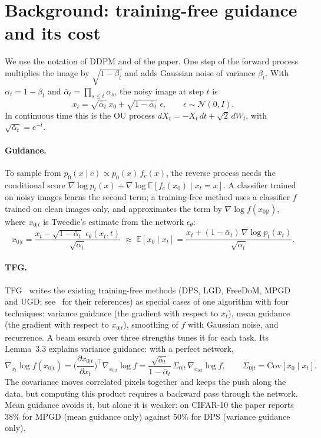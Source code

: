 \documentclass[11pt]{article}
\newcommand{\E}{\mathbb{E}}
\newcommand{\N}{\mathcal{N}}
\begin{document}
\section{Background: training-free guidance and its cost}
We use the notation of DDPM and of the paper. One step of the forward process multiplies the image by
$\sqrt{1-\beta_t}$ and adds Gaussian noise of variance $\beta_t$. With $\alpha_t = 1-\beta_t$ and
$\bar\alpha_t = \prod_{s\le t}\alpha_s$, the noisy image at step $t$ is
\begin{equation}\label{eq:forward}
  x_t = \sqrt{\bar\alpha_t}\,x_0 + \sqrt{1-\bar\alpha_t}\;\epsilon, \qquad \epsilon\sim\N(0, I).
\end{equation}
In continuous time this is the OU process $dX_t = -X_t\,dt + \sqrt2\,dW_t$, with $\sqrt{\bar\alpha_t} = e^{-t}$.

\paragraph{Guidance.} To sample from $p_0(x \mid c) \propto p_0(x)\,f_c(x)$, the reverse process needs the conditional
score $\nabla\log p_t(x) + \nabla\log \E[f_c(x_0) \mid x_t = x]$. A classifier trained on noisy images learns the
second term; a training-free method uses a classifier $f$ trained on clean images only, and approximates the term by
$\nabla\log f(x_{0|t})$, where $x_{0|t}$ is Tweedie's estimate from the network $\epsilon_\theta$:
\begin{equation}\label{eq:tweedie}
  x_{0|t} = \frac{x_t - \sqrt{1-\bar\alpha_t}\;\epsilon_\theta(x_t, t)}{\sqrt{\bar\alpha_t}} \;\approx\;
  \E[x_0 \mid x_t] = \frac{x_t + (1-\bar\alpha_t)\,\nabla\log p_t(x_t)}{\sqrt{\bar\alpha_t}}.
\end{equation}

\paragraph{TFG.} TFG~\cite{tfg} writes the existing training-free methods (DPS, LGD, FreeDoM, MPGD and
UGD; see~\cite{tfg} for their references) as special cases of one algorithm with four techniques: variance guidance (the gradient with respect to $x_t$),
mean guidance (the gradient with respect to $x_{0|t}$), smoothing of $f$ with Gaussian noise, and recurrence. A beam
search over three strengths tunes it for each task. Its Lemma~3.3 explains variance guidance: with a perfect network,
\begin{equation}\label{eq:lemma}
  \nabla_{x_t}\log f(x_{0|t}) = \Big(\frac{\partial x_{0|t}}{\partial x_t}\Big)^{\!\top}\nabla_{x_{0|t}}\log f
  = \frac{\sqrt{\bar\alpha_t}}{1-\bar\alpha_t}\,\Sigma_{0|t}\,\nabla_{x_{0|t}}\log f, \qquad
  \Sigma_{0|t} = \mathrm{Cov}[x_0 \mid x_t].
\end{equation}
The covariance moves correlated pixels together and keeps the push along the data, but computing this product requires
a backward pass through the network. Mean guidance avoids it, but alone it is weaker: on CIFAR-10 the paper reports 38\%
for MPGD (mean guidance only) against 50\% for DPS (variance guidance only).
\end{document}
